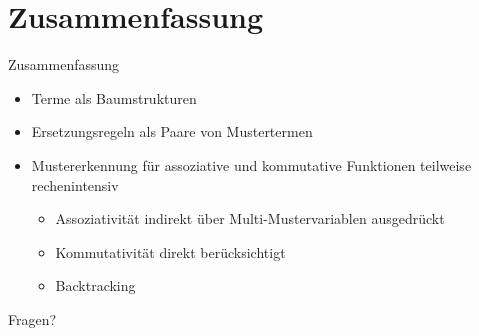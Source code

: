 \documentclass{beamer}
\begin{document}
\section{Zusammenfassung}
\begin{frame}{Zusammenfassung}
	\begin{itemize}
		\item{Terme als Baumstrukturen}
		\item{Ersetzungsregeln als Paare von Mustertermen}
		\item{Mustererkennung für assoziative und kommutative Funktionen teilweise rechenintensiv}
		\begin{itemize}
			\item{Assoziativität indirekt über Multi-Mustervariablen ausgedrückt}
			\item{Kommutativität direkt berücksichtigt}
			\item{Backtracking}
		\end{itemize}
	\end{itemize}
\end{frame}


\begin{frame}
	\begin{center}
		\Huge
		Fragen?
	\end{center}
\end{frame}

\end{document}
